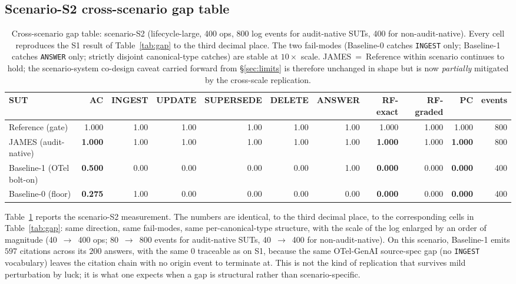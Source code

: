 \documentclass[11pt,a4paper]{article}
\begin{document}
\subsection{Scenario-S2 cross-scenario gap table}
\label{sec:results-s2}

\begin{table}[t]
\centering
\caption{Cross-scenario gap table: scenario-S2 (lifecycle-large, 400 ops, 800 log events for audit-native SUTs, 400 for non-audit-native). Every cell reproduces the S1 result of Table~\ref{tab:gap} to the third decimal place. The two fail-modes (Baseline-0 catches \texttt{INGEST} only; Baseline-1 catches \texttt{ANSWER} only; strictly disjoint canonical-type catches) are stable at $10\times$ scale. JAMES~=~Reference within scenario continues to hold; the scenario-system co-design caveat carried forward from §\ref{sec:limits} is therefore unchanged in shape but is now \emph{partially} mitigated by the cross-scale replication.}
\label{tab:gap-s2}
\small
\setlength{\tabcolsep}{4pt}
\begin{tabular}{lrrrrrrrrrr}
\toprule
\textbf{SUT} & \textbf{AC} & \textbf{INGEST} & \textbf{UPDATE} & \textbf{SUPERSEDE} & \textbf{DELETE} & \textbf{ANSWER} & \textbf{RF-exact} & \textbf{RF-graded} & \textbf{PC} & \textbf{events} \\
\midrule
Reference (gate)          & 1.000 & 1.00 & 1.00 & 1.00 & 1.00 & 1.00 & 1.000 & 1.000 & 1.000 & 800 \\
JAMES (audit-native)      & \textbf{1.000} & 1.00 & 1.00 & 1.00 & 1.00 & 1.00 & \textbf{1.000} & 1.000 & \textbf{1.000} & 800 \\
Baseline-1 (OTel bolt-on) & \textbf{0.500} & 0.00 & 0.00 & 0.00 & 0.00 & 1.00 & \textbf{0.000} & 0.000 & \textbf{0.000} & 400 \\
Baseline-0 (floor)        & \textbf{0.275} & 1.00 & 0.00 & 0.00 & 0.00 & 0.00 & \textbf{0.000} & 0.000 & \textbf{0.000} & 400 \\
\bottomrule
\end{tabular}
\end{table}

Table~\ref{tab:gap-s2} reports the scenario-S2 measurement. The numbers are identical, to the third decimal place, to the corresponding cells in Table~\ref{tab:gap}: same direction, same fail-modes, same per-canonical-type structure, with the scale of the log enlarged by an order of magnitude (40~$\to$~400 ops; 80~$\to$~800 events for audit-native SUTs, 40~$\to$~400 for non-audit-native). On this scenario, Baseline-1 emits $597$ citations across its $200$ answers, with the same $0$ traceable as on S1, because the same OTel-GenAI source-spec gap (no \texttt{INGEST} vocabulary) leaves the citation chain with no origin event to terminate at. This is not the kind of replication that survives mild perturbation by luck; it is what one expects when a gap is structural rather than scenario-specific.
\end{document}
